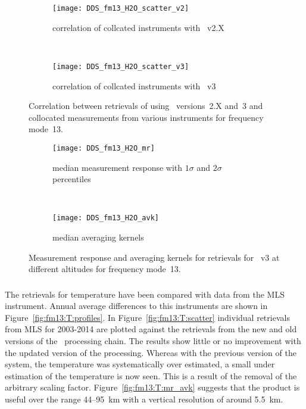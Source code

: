 \begin{figure}[tbhp]
    \centering
    \begin{subfigure}[b]{0.49\textwidth}
        \texttt{[image: DDS\_fm13\_H2O\_scatter\_v2]}
        \caption{correlation of collcated instruments with \smr~v2.X}
        \label{fig:fm13:H2O:scatter:v2}
    \end{subfigure}
    \,
    \begin{subfigure}[b]{0.49\textwidth}
        \texttt{[image: DDS\_fm13\_H2O\_scatter\_v3]}
        \caption{correlation of collcated instruments with \smr~v3}
        \label{fig:fm13:H2O:scatter:v3}
    \end{subfigure}
    \caption{Correlation between retrievals of  using \smr\
    versions~2.X and~3 and collocated measurements from various instruments
    for frequency mode~13.}
    \label{fig:fm13:H2O:scatter}
\end{figure}

\begin{figure}[tbhp]
    \centering
    \begin{subfigure}[b]{0.49\textwidth}
        \texttt{[image: DDS\_fm13\_H2O\_mr]}
        \caption{median measurement response with $1\sigma$ and $2\sigma$
        percentiles}
        \label{fig:fm13:H2O:mr}
    \end{subfigure}
    \,
    \begin{subfigure}[b]{0.49\textwidth}
        \texttt{[image: DDS\_fm13\_H2O\_avk]}
        \caption{median averaging kernels\newline~}
        \label{fig:fm13:H2O:avk}
    \end{subfigure}
    \caption{Measurement response and averaging kernels for 
    retrievals for \smr~v3 at different altitudes for frequency mode~13.}
    \label{fig:fm13:H2O:mr_avk}
\end{figure}



\subsubsection{}
\label{sec:fm13:comparison:temperature}
The retrievals for temperature have been compared with data from the MLS
instrument. Annual average differences to this instruments are shown in
Figure~\ref{fig:fm13:T:profiles}. In Figure~\ref{fig:fm13:T:scatter} individual
retrievals from MLS for 2003-2014 are plotted against the retrievals
from the new and old versions of the \smr\ processing chain. The results show
little or no improvement with the updated version of the processing. Whereas
with the previous version of the system, the temperature was systematically
over estimated, a small under estimation of the temperature is now seen. This
is a result of the removal of the arbitrary scaling factor.
Figure~\ref{fig:fm13:T:mr_avk} suggests that the product is useful over the
range 44--95~km with a vertical resolution of around 5.5~km.

